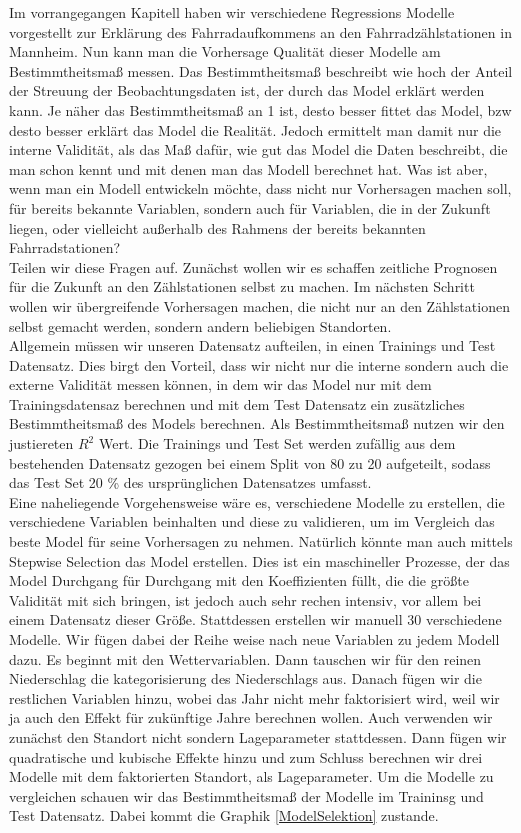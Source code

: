 \documentclass[a4paper,12pt]{thesis}
\begin{document}
Im vorrangegangen Kapitell haben wir verschiedene Regressions Modelle vorgestellt zur Erklärung des Fahrradaufkommens an den Fahrradzählstationen in Mannheim. Nun kann man die Vorhersage Qualität dieser Modelle am Bestimmtheitsmaß messen. Das Bestimmtheitsmaß beschreibt wie hoch der Anteil der Streuung der Beobachtungsdaten ist, der durch das Model erklärt werden kann. Je näher das Bestimmtheitsmaß an 1 ist, desto besser fittet das Model, bzw desto besser erklärt das Model die Realität. Jedoch ermittelt man damit nur die interne Validität, als das Maß dafür, wie gut das Model die Daten beschreibt, die man schon kennt und mit denen man das Modell berechnet hat. Was ist aber, wenn man ein Modell entwickeln möchte, dass nicht nur Vorhersagen machen soll, für bereits bekannte Variablen, sondern auch für Variablen, die in der Zukunft liegen, oder vielleicht außerhalb des Rahmens der bereits bekannten Fahrradstationen?\\
Teilen wir diese Fragen auf. Zunächst wollen wir es schaffen zeitliche Prognosen für die Zukunft an den Zählstationen selbst zu machen. Im nächsten Schritt wollen wir übergreifende Vorhersagen machen, die nicht nur an den Zählstationen selbst gemacht werden, sondern andern beliebigen Standorten.\\
Allgemein müssen wir unseren Datensatz aufteilen, in einen Trainings und Test Datensatz. Dies birgt den Vorteil, dass wir nicht nur die interne sondern auch die externe Validität messen können, in dem wir das Model nur mit dem Trainingsdatensaz berechnen und mit dem Test Datensatz ein zusätzliches Bestimmtheitsmaß des Models berechnen. Als Bestimmtheitsmaß nutzen wir den justiereten $R^2$ Wert. Die Trainings und Test Set werden zufällig aus dem bestehenden Datensatz gezogen bei einem Split von 80 zu 20 aufgeteilt, sodass das Test Set 20 \% des ursprünglichen Datensatzes umfasst.\\
Eine naheliegende Vorgehensweise wäre es, verschiedene Modelle zu erstellen, die verschiedene Variablen beinhalten und diese zu validieren, um im Vergleich das beste Model für seine Vorhersagen zu nehmen. Natürlich könnte man auch mittels Stepwise Selection das Model erstellen. Dies ist ein maschineller Prozesse, der das Model Durchgang für Durchgang mit den Koeffizienten füllt, die die größte Validität mit sich bringen, ist jedoch auch sehr rechen intensiv, vor allem bei einem Datensatz dieser Größe. Stattdessen erstellen wir manuell 30 verschiedene Modelle. Wir fügen dabei der Reihe weise nach neue Variablen zu jedem Modell dazu. Es beginnt mit den Wettervariablen. Dann tauschen wir für den reinen Niederschlag die kategorisierung des Niederschlags aus. Danach fügen wir die restlichen Variablen hinzu, wobei das Jahr nicht mehr faktorisiert wird, weil wir ja auch den Effekt für zukünftige Jahre berechnen wollen. Auch verwenden wir zunächst den Standort nicht sondern Lageparameter stattdessen. Dann fügen wir quadratische und kubische Effekte hinzu und zum Schluss berechnen wir drei Modelle mit dem faktorierten Standort, als Lageparameter. Um die Modelle zu vergleichen schauen wir das Bestimmtheitsmaß der Modelle im Traininsg und Test Datensatz. Dabei kommt die Graphik \ref{ModelSelektion} zustande.
\end{document}
